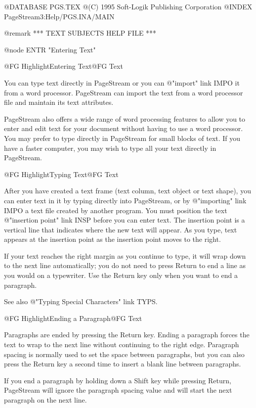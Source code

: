 @DATABASE PGS.TEX
@(C) 1995 Soft-Logik Publishing Corporation
@INDEX PageStream3:Help/PGS.INA/MAIN



@remark *** TEXT SUBJECTS HELP FILE ***

@node ENTR "Entering Text"

@{FG Highlight}Entering Text@{FG Text}

You can type text directly in PageStream or you can @{"import" link IMPO} it from a word
processor. PageStream can import the text from a word processor file and
maintain its text attributes.

PageStream also offers a wide range of word processing features to allow
you to enter and edit text for your document without having to use a word
processor. You may prefer to type directly in PageStream for small blocks
of text. If you have a faster computer, you may wish to type all your
text directly in PageStream.

@{FG Highlight}Typing Text@{FG Text}

After you have created a text frame (text column, text object or text
shape), you can enter text in it by typing directly into PageStream, or
by @{"importing" link IMPO} a text file created by another program. You must position
the text @{"insertion point" link INSP} before you can enter text. The insertion point
is a vertical line that indicates where the new text will appear. As you
type, text appears at the insertion point as the insertion point moves to
the right.

If your text reaches the right margin as you continue to type, it will
wrap down to the next line automatically; you do not need to press Return
to end a line as you would on a typewriter. Use the Return key only when
you want to end a paragraph.

See also @{"Typing Special Characters" link TYPS}.

@{FG Highlight}Ending a Paragraph@{FG Text}

Paragraphs are ended by pressing the Return key. Ending a paragraph
forces the text to wrap to the next line without continuing to the right
edge. Paragraph spacing is normally used to set the space between
paragraphs, but you can also press the Return key a second time to insert
a blank line between paragraphs.

If you end a paragraph by holding down a Shift key while pressing Return,
PageStream will ignore the paragraph spacing value and will start the
next paragraph on the next line.

